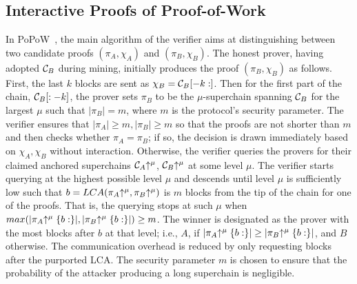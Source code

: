 \subsection{Interactive Proofs of Proof-of-Work}
In PoPoW~\cite{KLS}, the main algorithm of the verifier aims at distinguishing
between two candidate proofs $(\pi_A, \chi_A)$ and $(\pi_B, \chi_B)$. The honest
prover, having adopted $\mathcal{C}_B$ during mining, initially produces the proof
$(\pi_B, \chi_B)$ as follows. First, the last $k$ blocks are sent as $\chi_B =
\mathcal{C}_B[-k:]$. Then for the first part of the chain, $\mathcal{C}_B[:-k]$, the
prover sets $\pi_B$ to be the $\mu$-superchain spanning $\mathcal{C}_B$ for the
largest $\mu$ such that $|\pi_B| = m$, where $m$ is the protocol's security
parameter. The verifier ensures that $|\pi_A| \geq m, |\pi_B| \geq m$ so that
the proofs are not shorter than $m$ and then checks whether $\pi_A = \pi_B$; if
so, the decision is drawn immediately based on $\chi_A,\chi_B$ without
interaction. Otherwise, the verifier queries the provers for their claimed
anchored superchains $\mathcal{C}_A\negthickspace\uparrow^\mu$, $\mathcal{C}_B\negthickspace\uparrow^\mu$ at some
level $\mu$. The verifier starts querying at the highest possible level $\mu$
and descends until level $\mu$ is sufficiently low such that $b =
LCA(\pi_A\negthickspace\uparrow^\mu, \pi_B\negthickspace\uparrow^\mu)$ is $m$ blocks from the tip of the
chain for one of the proofs. That is, the querying stops at such $\mu$ when
$max(|\pi_A\negthickspace\uparrow^\mu\{b:\}|, |\pi_B\negthickspace\uparrow^\mu\{b:\}|) \geq m$. The winner
is designated as the prover with the most blocks after $b$ at that level; i.e.,
$A$, if $|\pi_A\negthickspace\uparrow^\mu\{b:\}| \geq |\pi_B\negthickspace\uparrow^\mu\{b:\}|$, and $B$
otherwise. The communication overhead is reduced by only requesting blocks after
the purported LCA. The security parameter $m$ is chosen to ensure that the
probability of the attacker producing a long superchain is negligible.

